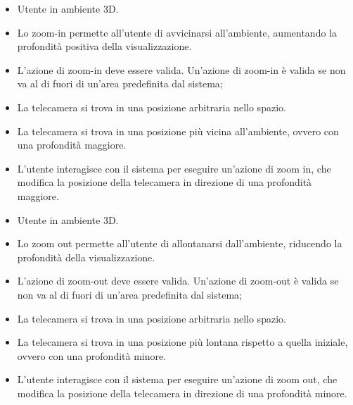 \UCdsc
{ %
    \begin{itemize}
        \item Utente in ambiente 3D.
    \end{itemize}
}
{ %
    \begin{itemize}
        \item Lo zoom-in permette all'utente di avvicinarsi all'ambiente, aumentando la profondità positiva della visualizzazione.
    \end{itemize}
}
{ %
    \begin{itemize}
        \item L'azione di zoom-in deve essere valida. Un'azione di zoom-in è valida se non va al di fuori di un'area predefinita dal sistema;
        \item La telecamera si trova in una posizione arbitraria nello spazio.
    \end{itemize}
}
{ %
    \begin{itemize}
        \item La telecamera si trova in una posizione più vicina all'ambiente, ovvero con una profondità maggiore.
    \end{itemize}
}
{ %
    \begin{itemize}
        \item L'utente interagisce con il sistema per eseguire un'azione di zoom in, che modifica la posizione della telecamera in direzione di una profondità maggiore.
    \end{itemize}
} 

\UCdsc
{ %
    \begin{itemize}
        \item Utente in ambiente 3D.
    \end{itemize}
}
{ %
    \begin{itemize}
        \item Lo zoom out permette all'utente di allontanarsi dall'ambiente, riducendo la profondità della visualizzazione.
    \end{itemize}
}
{ %
    \begin{itemize}
        \item L'azione di zoom-out deve essere valida. Un'azione di zoom-out è valida se non va al di fuori di un'area predefinita dal sistema;
        \item La telecamera si trova in una posizione arbitraria nello spazio.
    \end{itemize}
}
{ %
    \begin{itemize}
        \item La telecamera si trova in una posizione più lontana rispetto a quella iniziale, ovvero con una profondità minore.
    \end{itemize}
}
{ %
    \begin{itemize}
        \item L'utente interagisce con il sistema per eseguire un'azione di zoom out, che modifica la posizione della telecamera in direzione di una profondità minore.
    \end{itemize}
} 

